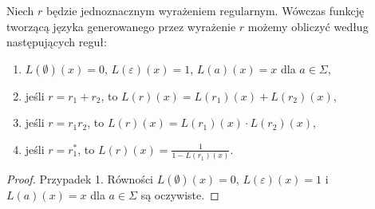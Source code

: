 \begin{theorem}
  Niech $r$ będzie jednoznacznym wyrażeniem regularnym. Wówczas funkcję tworzącą języka generowanego przez wyrażenie $r$ możemy obliczyć według następujących reguł:
  \begin{enumerate}
      \item $L(\emptyset)(x)=0$, $L(\varepsilon)(x)=1$, $L(a)(x)=x$ dla $a\in\Sigma$,
      \item jeśli $r=r_1+r_2$, to $L(r)(x)=L(r_1)(x)+L(r_2)(x)$,
      \item jeśli $r=r_1 r_2$, to $L(r)(x)=L(r_1)(x)\cdot L(r_2)(x)$,
      \item jeśli $r=r_1^*$, to $L(r)(x)=\frac{1}{1-L(r_1)(x)}$.
  \end{enumerate}
\end{theorem}
\begin{proof}

Przypadek 1. Równości $L(\emptyset)(x)=0$, $L(\varepsilon)(x)=1$ i $L(a)(x)=x$ dla $a\in\Sigma$ są oczywiste.


\end{proof}
